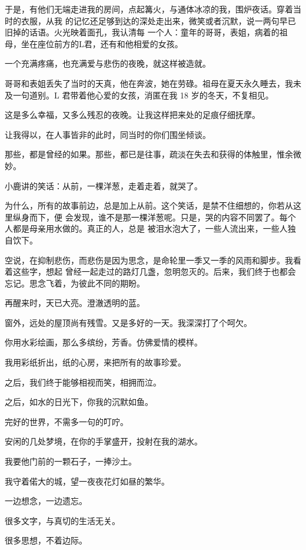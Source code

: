 		于是，有他们无端走进我的房间，点起篝火，与通体冰凉的我，围炉夜话。穿着当时的衣服，从我
	的记忆还足够到达的深处走出来，微笑或者沉默，说一两句早已旧掉的话语。火光映着面孔，我认清每
	一个人：童年的哥哥，表姐，病着的祖母，坐在座位前方的L君，还有和他相爱的女孩。

		一个充满疼痛，也充满爱与悲伤的夜晚，就这样被造就。

		哥哥和表姐丢失了当时的天真，他在奔波，她在劳碌。祖母在夏天永久睡去，我未及一句道别。L
	君带着他心爱的女孩，消匿在我 18 岁的冬天，不复相见。

		这是多么幸福，又多么残忍的夜晚。让我这样把来处的足痕仔细抚摩。

		让我得以，在人事皆非的此时，同当时的你们围坐倾谈。

		那些，都是曾经的如果。那些，都已是往事，疏淡在失去和获得的体触里，惟余微妙。

		小鹿讲的笑话：从前，一棵洋葱，走着走着，就哭了。

		为什么，所有的故事前边，总是加上从前。这个笑话，是禁不住细想的，你若从这里纵身而下，便
	会发现，谁不是那一棵洋葱呢。只是，哭的内容不同罢了。每个人都是母亲用水做的。真正的人，总是
	被泪水泡大了，一些人流出来，一些人独自饮下。

		空说，在抑制悲伤，而悲伤是因为思念，是命轮里一季又一季的风雨和脚步。我看着这些字，想起
	曾经一起走过的路灯几盏，忽明忽灭的。后来，我们终于也都会忘记。思念飞着，为彼此不同的期盼。

		再醒来时，天已大亮。澄澈透明的蓝。

		窗外，远处的屋顶尚有残雪。又是多好的一天。我深深打了个呵欠。

	\endwriting



		你用水彩绘画，那么多缤纷，芳香。仿佛爱情的模样。\par
		我用彩纸折出，纸的心房，来把所有的故事珍爱。

		之后，我们终于能够相视而笑，相拥而泣。\par
		之后，如水的日光下，你我的沉默如鱼。

		完好的世界，不需多一句的叮咛。\par
		安闲的几处梦境，在你的手掌盛开，投射在我的湖水。\par
		我要他门前的一颗石子，一捧沙土。\par
		我守着偌大的城，望一夜夜花灯如昼的繁华。\par
		一边想念，一边遗忘。


		很多文字，与真切的生活无关。\par
		很多思想，不着边际。

